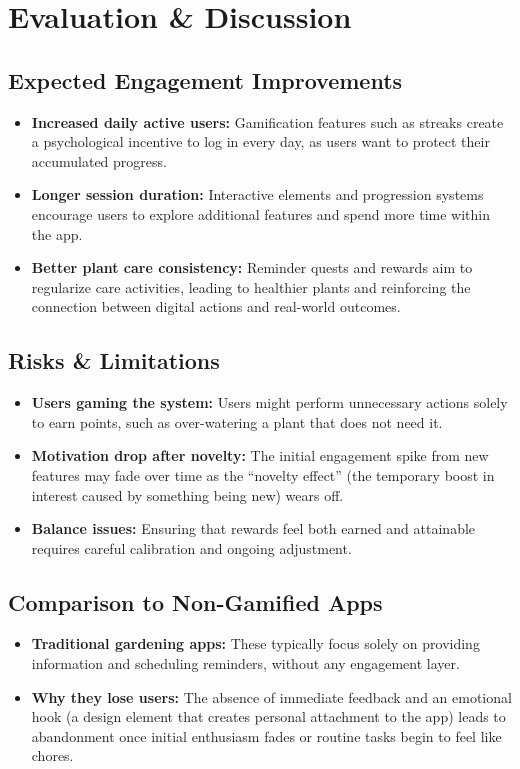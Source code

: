 \section{Evaluation \& Discussion}

\subsection{Expected Engagement Improvements}
\begin{itemize}
    \item \textbf{Increased daily active users:} Gamification features such as streaks create a psychological incentive to log in every day, as users want to protect their accumulated progress.
    \item \textbf{Longer session duration:} Interactive elements and progression systems encourage users to explore additional features and spend more time within the app.
    \item \textbf{Better plant care consistency:} Reminder quests and rewards aim to regularize care activities, leading to healthier plants and reinforcing the connection between digital actions and real-world outcomes.
\end{itemize}

\subsection{Risks \& Limitations}
\begin{itemize}
    \item \textbf{Users gaming the system:} Users might perform unnecessary actions solely to earn points, such as over-watering a plant that does not need it.
    \item \textbf{Motivation drop after novelty:} The initial engagement spike from new features may fade over time as the ``novelty effect'' (the temporary boost in interest caused by something being new) wears off.
    \item \textbf{Balance issues:} Ensuring that rewards feel both earned and attainable requires careful calibration and ongoing adjustment.
\end{itemize}

\subsection{Comparison to Non-Gamified Apps}
\begin{itemize}
    \item \textbf{Traditional gardening apps:} These typically focus solely on providing information and scheduling reminders, without any engagement layer.
    \item \textbf{Why they lose users:} The absence of immediate feedback and an emotional hook (a design element that creates personal attachment to the app) leads to abandonment once initial enthusiasm fades or routine tasks begin to feel like chores.
\end{itemize}
